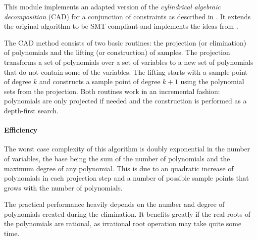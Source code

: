 This module implements an adapted version of the \emph{cylindrical algebraic decomposition} (CAD) for a conjunction of constraints as described in \cite{Article_Collins_75}.
It extends the original algorithm to be SMT compliant and implements the ideas from \cite{Article_Loup_TubeCAD}.

The CAD method consists of two basic routines: the projection (or elimination) of polynomials and the lifting (or construction) of samples.
The projection transforms a set of polynomials over a set of variables to a new set of polynomials that do not contain some of the variables.
The lifting starts with a sample point of degree $k$ and constructs a sample point of degree $k+1$ using the polynomial sets from the projection.
Both routines work in an incremental fashion: polynomials are only projected if needed and the construction is performed as a depth-first search.

\paragraph{Efficiency} 
The worst case complexity of this algorithm is doubly exponential in the number of variables, the base being the sum of the number of polynomials and the maximum degree of any polynomial.
This is due to an quadratic increase of polynomials in each projection step and a number of possible sample points that grows with the number of polynomials.

The practical performance heavily depends on the number and degree of polynomials created during the elimination.
It benefits greatly if the real roots of the polynomials are rational, as irrational root operation may take quite some time.
